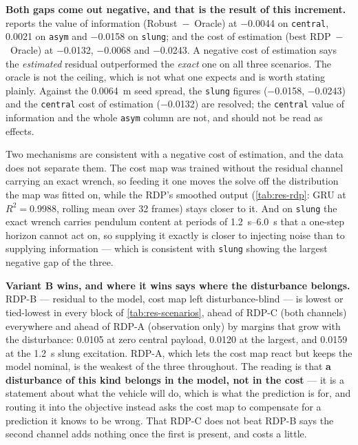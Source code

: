 \documentclass[11pt,a4paper,twoside,openright]{report}
\newcommand{\vSmooth}{32}                %
\theoremstyle{plain}
\theoremstyle{definition}
\theoremstyle{remark}
\begin{document}
	\textbf{Both gaps come out negative, and that is the result of this
	increment.}  reports the value of information
	(Robust~$-$~Oracle) at \num{-0.0044} on \texttt{central}, \num{+0.0021} on
	\texttt{asym} and \num{-0.0158} on \texttt{slung}; and the cost of
	estimation (best RDP~$-$~Oracle) at \num{-0.0132}, \num{-0.0068} and
	\num{-0.0243}. A negative cost of estimation says the \emph{estimated}
	residual outperformed the \emph{exact} one on all three scenarios. The
	oracle is not the ceiling, which is not what one expects and is worth
	stating plainly. Against the \SI{0.0064}{\metre} seed spread, the
	\texttt{slung} figures (\num{-0.0158}, \num{-0.0243}) and the
	\texttt{central} cost of estimation (\num{-0.0132}) are resolved; the
	\texttt{central} value of information and the whole \texttt{asym} column are
	not, and should not be read as effects.

	Two mechanisms are consistent with a negative cost of estimation, and the
	data does not separate them. The cost map was trained without the residual
	channel carrying an exact wrench, so feeding it one moves the solve off the
	distribution the map was fitted on, while the RDP's smoothed output
	(\cref{tab:res-rdp}: GRU at $R^2=\num{0.9988}$, rolling mean over
	\vSmooth{} frames) stays closer to it. And on \texttt{slung} the exact
	wrench carries pendulum content at periods of \SIrange{1.2}{6.0}{\second}
	that a one-step horizon cannot act on, so supplying it exactly is closer to
	injecting noise than to supplying information --- which is consistent with
	\texttt{slung} showing the largest negative gap of the three.

	\textbf{Variant B wins, and where it wins says where the disturbance
	belongs.} RDP-B --- residual to the model, cost map left
	disturbance-blind --- is lowest or tied-lowest in every block of
	\cref{tab:res-scenarios}, ahead of RDP-C (both channels) everywhere and
	ahead of RDP-A (observation only) by margins that grow with the disturbance:
	\num{0.0105} at zero central payload, \num{0.0120} at the largest, and
	\num{0.0159} at the \SI{1.2}{\second} slung excitation. RDP-A, which lets
	the cost map react but keeps the model nominal, is the weakest of the three
	throughout. The reading is that \textbf{a disturbance of this kind belongs
	in the model, not in the cost} --- it is a statement about what the vehicle
	will do, which is what the prediction is for, and routing it into the
	objective instead asks the cost map to compensate for a prediction it knows
	to be wrong. That RDP-C does not beat RDP-B says the second channel adds
	nothing once the first is present, and costs a little.
\end{document}
